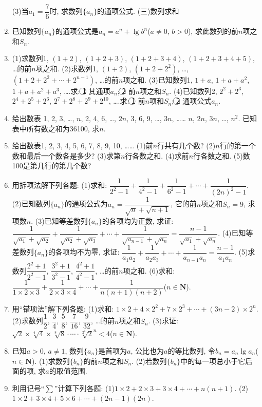 \documentclass[10pt,a4paper]{article}
\begin{document}
\begin{enumerate}[1.]
(3)当$a_1=\dfrac 76$时, 求数列$\{a_n\}$的通项公式.
(三)数列求和
\item 已知数列$\{a_n\}$的通项公式是$a_n=a^n+\lg b^n$($a\ne 0$, $b>0$), 求此数列的前$n$项之和$S_n$.
\item (1)求数列1, $(1+2)$, $(1+2+3)$, $(1+2+3+4)$, $(1+2+3+4+5)$, …的前$n$项之和.
(2)求数列1, $(1+2)$, $(1+2+2^2)$, …, $(1+2+2^2+\cdots +2^{n-1})$, …的前$n$项之和.
(3)已知数列1, $1+a$, $1+a+a^2$, $1+a+a^2+a^3$, ….求:
\textcircled{1} 其通项$a_n$;
\textcircled{2} 前$n$项之和$S_n$.
(4)已知数列2, $2^2+2^3$, $2^4+2^5+2^6$, $2^7+2^8+2^9+2^{10}$, ….求:
\textcircled{1} 前$n$项和$S_n$;
\textcircled{2} 通项公式$a_n$.
\item 给出数表
1, 2, 3, …, $n$,
2, 4, 6, …, $2n$,
3, 6, 9, …, $3n$,
……
$n$, $2n$, $3n$, …, $n^2$.
已知表中所有数之和为36100, 求$n$.
\item 给出数表1,
2, 3,
4, 5, 6,
7, 8, 9, 10,
……
(1)前$n$行共有几个数?
(2)$n$行的第一个数和最后一个数各是多少?
(3)求第$n$行各数之和.
(4)求前$n$行各数之和.
(5)数100是第几行的第几个数?
\item 用拆项法解下列各题:
(1)求和: $\dfrac 1{2^2-1}+\dfrac 1{4^2-1}+\dfrac 1{6^2-1}+\cdots +\dfrac 1{(2n)^2-1}$.
(2)已知数列$\{a_n\}$的通项公式为$a_n=\dfrac 1{\sqrt n+\sqrt {n+1}}$, 它的前$n$项之和$S_n=9$, 求项数$n$.
(3)已知等差数列$\{a_n\}$的各项均为正数, 求证: $\dfrac 1{\sqrt {a_1}+\sqrt {a_2}}+\dfrac 1{\sqrt {a_2}+\sqrt {a_3}}+\cdots +\dfrac 1{\sqrt {a_{n-1}}+\sqrt {a_n}}=\dfrac{n-1}{\sqrt {a_1}+\sqrt {a_n}}$.
(4)已知等差数列$\{a_n\}$的各项均不为零, 求证: $\dfrac 1{a_1a_2}+\dfrac 1{a_2a_3}+\cdots +\dfrac 1{a_{n-1}a_n}=\dfrac{n-1}{{a_1}{a_n}}$.
(5)求数列$\dfrac{{2^2}+1}{{2^2}-1}$, $\dfrac{{3^2}+1}{{3^2}-1}$, $\dfrac{{4^2}+1}{{4^2}-1}$, …的前$n$项之和.
(6)求和: $\dfrac 1{1\times 2\times 3}+\dfrac 1{2\times 3\times 4}+\cdots +\dfrac 1{n(n+1)(n+2)}$($n\in \mathbf{N}$).
\item 用``错项法''解下列各题:
(1)求和: $1\times 2+4\times 2^2+7\times 2^3+\cdots +(3n-2)\times 2^n$.
(2)求数列$\dfrac 12$, $\dfrac 34$, $\dfrac 58$, $\dfrac 7{16}$, $\dfrac 9{32}$, …的前$n$项之和$S_n$.
(3)求证: $\sqrt 2\times \sqrt[4]4\times \sqrt[8]8\cdot \cdots \cdot \sqrt[2^n]2^n<4$($n\in \mathbf{N}$).
\item 已知$a>0$, $a\ne 1$, 数列$\{a_n\}$是首项为$a$, 公比也为$a$的等比数列, 令$b_n=a_n\lg a_n$($n\in \mathbf{N}$).
(1)求数列$\{b_n\}$的前$n$项之和$S_n$.
(2)若数列$\{b_n\}$中的每一项总小于它后面的项, 求$a$的取值范围.
\item 利用记号``$\sum$''计算下列各题:
(1)$1\times 2+2\times 3+3\times 4+\cdots +n(n+1)$.
(2)$1\times 2+3\times 4+5\times 6+\cdots +(2n-1)(2n)$.

\end{enumerate}
\end{document}
